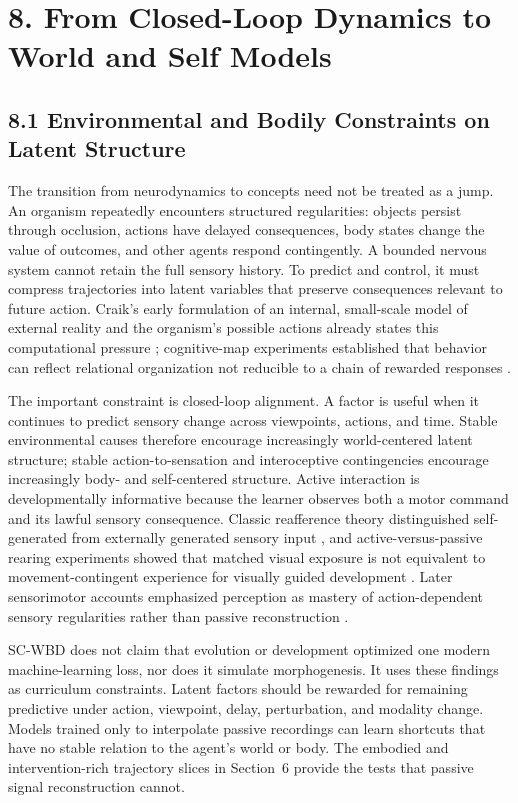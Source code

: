 \ClosedLoopFigure

\section{8. From Closed-Loop Dynamics to World and Self Models}

\subsection{8.1 Environmental and Bodily Constraints on Latent Structure}

The transition from neurodynamics to concepts need not be treated as a jump.
An organism repeatedly encounters structured regularities: objects persist
through occlusion, actions have delayed consequences, body states change the
value of outcomes, and other agents respond contingently. A bounded nervous
system cannot retain the full sensory history. To predict and control, it must
compress trajectories into latent variables that preserve consequences
relevant to future action. Craik's early formulation of an internal,
small-scale model of external reality and the organism's possible actions
already states this computational pressure \citep{craik1943}; cognitive-map
experiments established that behavior can reflect relational organization not
reducible to a chain of rewarded responses \citep{tolman1948}.

The important constraint is closed-loop alignment. A factor is useful when it
continues to predict sensory change across viewpoints, actions, and time.
Stable environmental causes therefore encourage increasingly world-centered
latent structure; stable action-to-sensation and interoceptive contingencies
encourage increasingly body- and self-centered structure. Active interaction
is developmentally informative because the learner observes both a motor
command and its lawful sensory consequence. Classic reafference theory
distinguished self-generated from externally generated sensory input
\citep{vonholst1950}, and active-versus-passive rearing experiments showed
that matched visual exposure is not equivalent to movement-contingent
experience for visually guided development \citep{heldhein1963}. Later
sensorimotor accounts emphasized perception as mastery of action-dependent
sensory regularities rather than passive reconstruction
\citep{oregan2001}.

SC-WBD does not claim that evolution or development optimized one modern
machine-learning loss, nor does it simulate morphogenesis. It uses these
findings as curriculum constraints. Latent factors should be rewarded for
remaining predictive under action, viewpoint, delay, perturbation, and
modality change. Models trained only to interpolate passive recordings can
learn shortcuts that have no stable relation to the agent's world or body.
The embodied and intervention-rich trajectory slices in Section~6 provide the
tests that passive signal reconstruction cannot.

